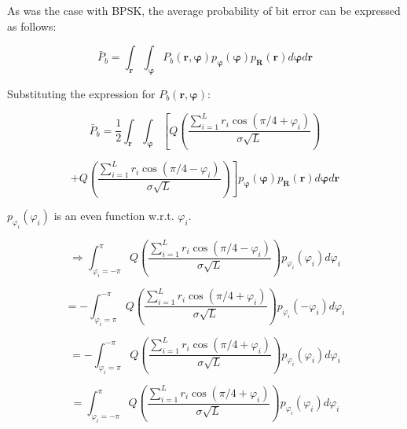 \documentclass[fleqn]{article}
\begin{document}
\begin{enumerate}
		As was the case with BPSK, the average probability of bit error can be expressed as follows:
		
		\begin{equation*}
			\bar{P}_b = \int_{\mathbf{r}}{\int_{\boldsymbol{\varphi}}{P_b(\mathbf{r},\boldsymbol{\varphi})p_{\boldsymbol{\varphi}}(\boldsymbol{\varphi})p_{\mathbf{R}}(\mathbf{r})d\boldsymbol{\varphi}}d\mathbf{r}}
		\end{equation*}
		
		Substituting the expression for $P_b(\mathbf{r},\boldsymbol{\varphi})$:
		
		\begin{equation*}
			\bar{P}_b = \frac{1}{2}\int_{\mathbf{r}}{\int_{\boldsymbol{\varphi}}{\left[Q\left(\frac{\sum_{i=1}^{L}{r_i\cos(\pi/4 + \varphi_i)}}{\sigma\sqrt{L}}\right)\right.}}
		\end{equation*}
		
		\begin{equation*}
			{{\left. + Q\left(\frac{\sum_{i=1}^{L}{r_i\cos(\pi/4 - \varphi_i)}}{\sigma\sqrt{L}}\right)\right]p_{\boldsymbol{\varphi}}(\boldsymbol{\varphi})p_{\mathbf{R}}(\mathbf{r})d\boldsymbol{\varphi}}d\mathbf{r}}
		\end{equation*}
		
		$p_{\varphi_i}(\varphi_i)$ is an even function w.r.t. $\varphi_i$.
		
		\begin{equation*}
			\Rightarrow \int_{\varphi_i=-\pi}^{\pi}{Q\left(\frac{\sum_{i=1}^{L}{r_i\cos(\pi/4 - \varphi_i)}}{\sigma\sqrt{L}}\right)p_{\varphi_i}(\varphi_i)d\varphi_i}
		\end{equation*}
		
		\begin{equation*}
			= - \int_{\varphi_i=\pi}^{-\pi}{Q\left(\frac{\sum_{i=1}^{L}{r_i\cos(\pi/4 + \varphi_i)}}{\sigma\sqrt{L}}\right)p_{\varphi_i}(-\varphi_i)d\varphi_i}
		\end{equation*}
		
		\begin{equation*}
			= - \int_{\varphi_i=\pi}^{-\pi}{Q\left(\frac{\sum_{i=1}^{L}{r_i\cos(\pi/4 + \varphi_i)}}{\sigma\sqrt{L}}\right)p_{\varphi_i}(\varphi_i)d\varphi_i}
		\end{equation*}
		
		\begin{equation*}
			= \int_{\varphi_i=-\pi}^{\pi}{Q\left(\frac{\sum_{i=1}^{L}{r_i\cos(\pi/4 + \varphi_i)}}{\sigma\sqrt{L}}\right)p_{\varphi_i}(\varphi_i)d\varphi_i}
		\end{equation*}
		

\end{enumerate}
\end{document}
